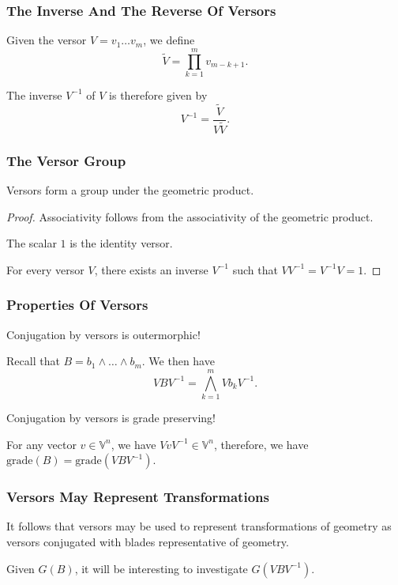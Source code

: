 \documentclass{beamer}
\newcommand{\V}{\mathbb{V}}
\newcommand{\grade}{\mbox{grade}}
\begin{document}
\begin{frame}
\frametitle{The Inverse And The Reverse Of Versors}
\begin{definition}
Given the versor $V=v_1\dots v_m$, we define
\begin{equation*}
\tilde{V} = \prod_{k=1}^m v_{m-k+1}.
\end{equation*}
\end{definition}
The inverse $V^{-1}$ of $V$ is therefore given by
\begin{equation*}
V^{-1} = \frac{\tilde{V}}{V\tilde{V}}.
\end{equation*}
\end{frame}

\begin{frame}
\frametitle{The Versor Group}
Versors form a group under the geometric product.
\begin{proof}
\alert{Associativity} follows from the associativity of the geometric product.

The scalar $1$ is the \alert{identity} versor.

For every versor $V$, there exists an \alert{inverse} $V^{-1}$ such that $VV^{-1}=V^{-1}V=1$.
\end{proof}
\end{frame}

\begin{frame}
\frametitle{Properties Of Versors}
Conjugation by versors is \alert{outermorphic}!

Recall that $B=b_1\wedge\dots\wedge b_m$.
We then have
\begin{equation*}
VBV^{-1} = \bigwedge_{k=1}^m Vb_kV^{-1}.
\end{equation*}

Conjugation by versors is \alert{grade preserving}!

For any vector $v\in\V^n$, we have $VvV^{-1}\in\V^n$,
therefore, we have $\grade(B)=\grade(VBV^{-1})$.

\end{frame}

\begin{frame}
\frametitle{Versors May Represent Transformations}
It follows that versors may be used to represent transformations
of geometry as versors conjugated with blades representative of geometry.

Given $G(B)$, it will be interesting to investigate $G(VBV^{-1})$.
\end{frame}
\end{document}
